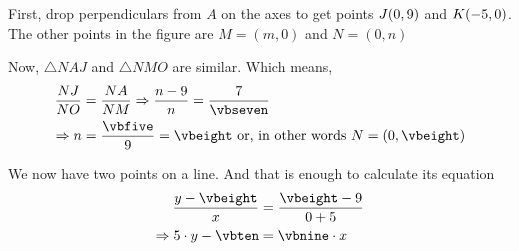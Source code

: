 \begin{solution}[\halfpage]
	First, drop perpendiculars from $A$ on the axes to get points $J(0,9)$ and $K(-5,0)$. 
  The other points in the figure are $M = (m,0)$ and $N = (0,n)$
	
	Now, $\bigtriangleup NAJ$ and $\bigtriangleup NMO$ are similar. Which means, 
	\begin{align}
		\dfrac{NJ}{NO} &= \dfrac{NA}{NM} \Rightarrow \dfrac{n-\vbtwo}{n} = \dfrac{\vbthree}{\vbseven} \\
		\Rightarrow n &= \dfrac{\vbfive}{\vbfour} = \vbeight \text{ or, in other words } N = (0, \vbeight)
	\end{align}
	
	\gcalcexpr[0]{\vbnine}{\vbeight - \vbtwo}
	\gcalcexpr[0]{\vbten}{\vbeight * \vbone }
	
	We now have two points on a line. And that is enough to calculate its equation
	\begin{align}
		\dfrac{y-\vbeight}{x} &= \dfrac{\vbeight - \vbtwo}{0 + \vbone} \\
		\Rightarrow \vbone\cdot y - \vbten &= \vbnine\cdot x
	\end{align}
	
\end{solution}

